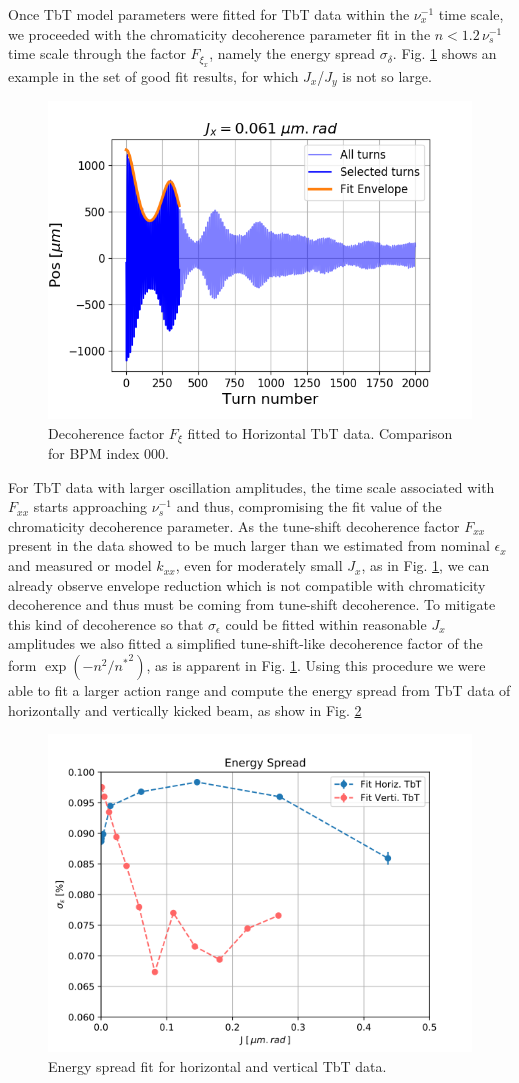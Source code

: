 \documentclass[a4paper,
               keeplastbox,   %
               ]{jacow}
\begin{document}
Once TbT model parameters were fitted for TbT data within the $\nu^{-1}_x$ time scale, we proceeded with the chromaticity decoherence parameter fit in the $n < 1.2 \, \nu^{-1}_s$ time scale through the factor $F_{\xi_x}$, namely the energy spread $\sigma_\delta$. Fig. \ref{fig:residual} shows an example in the set of good fit results, for which $J_x$/$J_y$ is not so large. 
\begin{figure}[!htb]
  \centering
  \includegraphics*[width=.7\columnwidth]{TUPAB219_fig4.png}
  \caption{Decoherence factor $F_\xi$ fitted to Horizontal TbT data. Comparison for BPM index 000.}
  \label{fig:residual}
\end{figure}
For TbT data with larger oscillation amplitudes, the time scale associated with $F_{xx}$ starts approaching $\nu^{-1}_s$ and thus, compromising the fit value of the chromaticity decoherence parameter. As the tune-shift decoherence factor $F_{xx}$ present in the data showed to be much larger than we estimated from nominal $\epsilon_x$ and measured or model $k_{xx}$, even for moderately small $J_x$, as in Fig. \ref{fig:residual}, we can already observe envelope reduction which is not compatible with chromaticity decoherence and thus must be coming from tune-shift decoherence. To mitigate this kind of decoherence so that $\sigma_\epsilon$ could be fitted within reasonable $J_x$ amplitudes we also fitted a simplified tune-shift-like decoherence factor of the form $\exp(-n^2/{n^*}^2)$, as is apparent in Fig. \ref{fig:residual}. Using this procedure we were able to fit a larger action range and compute the energy spread from TbT data of horizontally and vertically kicked beam, as show in Fig. \ref{fig:espread}
\begin{figure}[!htb]
  \centering
  \includegraphics*[width=.7\columnwidth]{TUPAB219_fig5.png}
  \caption{Energy spread fit for horizontal and vertical TbT data.}
  \label{fig:espread}
\end{figure}
\end{document}

